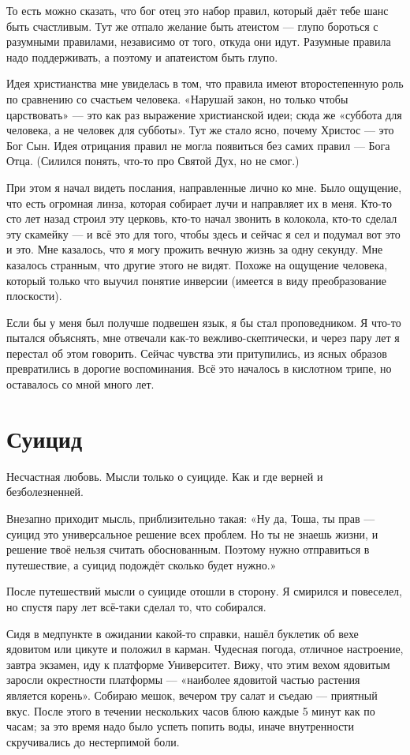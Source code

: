 \documentclass{book}
\begin{document}
То есть можно сказать, что бог отец это набор правил, который даёт тебе шанс быть счастливым.
Тут же отпало желание быть атеистом --- глупо бороться с разумными правилами, независимо от того, откуда они идут.
Разумные правила надо поддерживать, а поэтому и апатеистом быть глупо.

Идея христианства мне увиделась в том, что правила имеют второстепенную роль по сравнению со счастьем человека.
«Нарушай закон, но только чтобы царствовать» --- это как раз выражение христианской идеи;
сюда же «суббота для человека, а не человек для субботы».
Тут же стало ясно, почему Христос --- это Бог Сын.
Идея отрицания правил не могла появиться без самих правил --- Бога Отца.
(Силился понять, что-то про Святой Дух, но не смог.)

При этом я начал видеть послания, направленные лично ко мне.
Было ощущение, что есть огромная линза, которая собирает лучи и направляет их в меня.
Кто-то сто лет назад строил эту церковь, кто-то начал звонить в колокола, кто-то сделал эту скамейку --- и всё это для того, чтобы здесь и сейчас я сел и подумал вот это и это.
Мне казалось, что я могу прожить вечную жизнь за одну секунду.
Мне казалось странным, что другие этого не видят.
Похоже на ощущение человека, который только что выучил понятие инверсии (имеется в виду преобразование плоскости).

Если бы у меня был получше подвешен язык, я бы стал проповедником.
Я что-то пытался объяснять, мне отвечали как-то вежливо-скептически, и через пару лет я перестал об этом говорить.
Сейчас чувства эти притупились, из ясных образов превратились в дорогие воспоминания.
Всё это началось в кислотном трипе, но оставалось со мной много лет.

\section*{Суицид}
Несчастная любовь.
Мысли только о суициде.
Как и где верней и безболезненней.

Внезапно приходит мысль, приблизительно такая:
«Ну да, Тоша, ты прав --- суицид это универсальное решение всех проблем.
Но ты не знаешь жизни, и решение твоё нельзя считать обоснованным.
Поэтому нужно отправиться в путешествие, а суицид подождёт сколько будет нужно.»

После путешествий мысли о суициде отошли в сторону.
Я смирился и повеселел, но спустя пару лет всё-таки сделал то, что собирался.

Сидя в медпункте в ожидании какой-то справки, нашёл буклетик об вехе ядовитом или цикуте и положил в карман.
Чудесная погода, отличное настроение, завтра экзамен, иду к платформе Университет.
Вижу, что этим вехом ядовитым заросли окрестности платформы --- «наиболее ядовитой частью растения является корень».
Собираю мешок, вечером тру салат и съедаю --- приятный вкус.
После этого в течении нескольких часов блюю каждые 5 минут как по часам;
за это время надо было успеть попить воды, иначе внутренности скручивались до нестерпимой боли.
\end{document}
